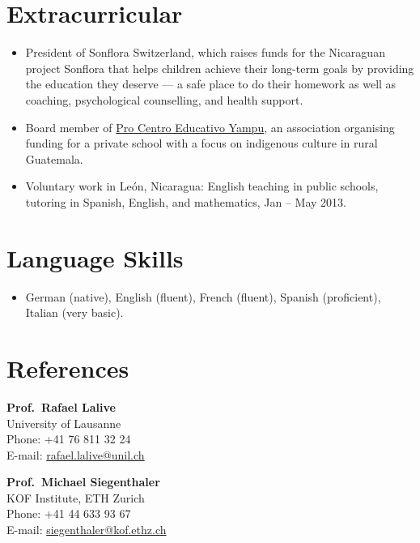 \documentclass[11pt]{article}
\begin{document}
\section{Extracurricular}
\begin{itemize}
\item President of Sonflora Switzerland, which raises funds for the Nicaraguan project Sonflora that helps children achieve their long-term goals by providing the education they deserve --- a safe place to do their homework as well as coaching, psychological counselling, and health support.
\item Board member of \href{https://ceyampu.org/}{Pro Centro Educativo Yampu}, an association organising funding for a private school with a focus on indigenous culture in rural Guatemala.
\item Voluntary work in Le\'on, Nicaragua: English teaching in public schools, tutoring in Spanish, English, and mathematics, Jan -- May 2013.
\end{itemize}

\section{Language Skills}
\begin{itemize}
\item German (native), English (fluent), French (fluent), Spanish (proficient), Italian (very basic).
\end{itemize}

\section{References}
\begin{minipage}[t]{0.48\textwidth}
\textbf{Prof.\ Rafael Lalive}\\
University of Lausanne\\
Phone: +41 76 811 32 24\\
E-mail: \href{mailto:rafael.lalive@unil.ch}{rafael.lalive@unil.ch}
\end{minipage}\hfill
\begin{minipage}[t]{0.48\textwidth}
\textbf{Prof.\ Michael Siegenthaler}\\
KOF Institute, ETH Zurich\\
Phone: +41 44 633 93 67\\
E-mail: \href{mailto:siegenthaler@kof.ethz.ch}{siegenthaler@kof.ethz.ch}
\end{minipage}
\end{document}
